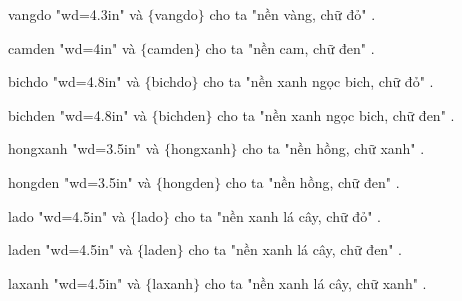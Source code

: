 \documentclass{beamer}
\numberwithin{equation}{section}
\begin{document}
\begin{frame}

\begin{beamercolorbox}[sep=.1em,wd=4.3in]{vangdo}
"wd=4.3in" và  $\{$vangdo$\}$ cho ta  "nền vàng, chữ đỏ" .
\end{beamercolorbox}

\medskip  		

\begin{beamercolorbox}[sep=.1em,wd=4in]{camden}
  	"wd=4in" và  $\{$camden$\}$ cho ta  "nền cam, chữ đen" .
\end{beamercolorbox}
\medskip  		

\begin{beamercolorbox}[sep=.1em,wd=4.8in]{bichdo}
  	"wd=4.8in" và  $\{$bichdo$\}$ cho ta  "nền xanh ngọc bich, chữ đỏ" .
\end{beamercolorbox}
\medskip  		

\begin{beamercolorbox}[sep=.1em,wd=4.8in]{bichden}
  	"wd=4.8in" và  $\{$bichden$\}$ cho ta  "nền xanh ngọc bich, chữ đen" .
\end{beamercolorbox}
\medskip  		

\begin{beamercolorbox}[sep=.1em,wd=3.5in]{hongxanh}
  	"wd=3.5in" và  $\{$hongxanh$\}$ cho ta  "nền hồng, chữ xanh" .
\end{beamercolorbox}

\medskip  		

\begin{beamercolorbox}[sep=.1em,wd=3.5in]{hongden}
  	"wd=3.5in" và  $\{$hongden$\}$ cho ta  "nền hồng, chữ đen" .
\end{beamercolorbox}

\medskip  		

\begin{beamercolorbox}[sep=.1em,wd=4.5in]{lado}
  	"wd=4.5in" và  $\{$lado$\}$ cho ta  "nền xanh lá cây, chữ đỏ" .
\end{beamercolorbox}

\medskip  		

\begin{beamercolorbox}[sep=.1em,wd=4.5in]{laden}
  	"wd=4.5in" và  $\{$laden$\}$ cho ta  "nền xanh lá cây, chữ đen" .
\end{beamercolorbox}

\medskip  		

\begin{beamercolorbox}[sep=.1em,wd=4.5in]{laxanh}
  	"wd=4.5in" và  $\{$laxanh$\}$ cho ta  "nền xanh lá cây, chữ xanh" .
\end{beamercolorbox}

\end{frame}
\end{document}
